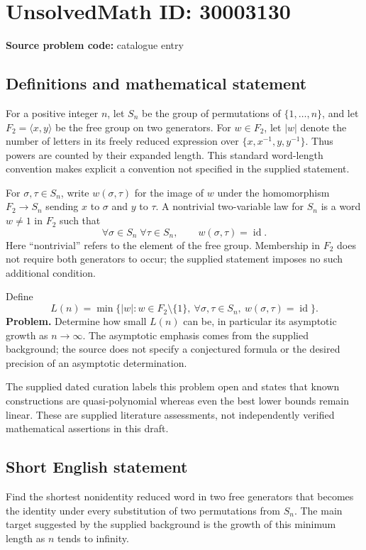 \documentclass[11pt]{article}
\begin{document}
\section*{UnsolvedMath ID: 30003130}
\textbf{Source problem code:} catalogue entry
\subsection{Definitions and mathematical statement}
For a positive integer \(n\), let \(S_n\) be the group of permutations of \(\{1,\ldots,n\}\), and let \(F_2=\langle x,y\rangle\) be the free group on two generators. For \(w\in F_2\), let \(|w|\) denote the number of letters in its freely reduced expression over \(\{x,x^{-1},y,y^{-1}\}\). Thus powers are counted by their expanded length. This standard word-length convention makes explicit a convention not specified in the supplied statement.

For \(\sigma,\tau\in S_n\), write \(w(\sigma,\tau)\) for the image of \(w\) under the homomorphism \(F_2\to S_n\) sending \(x\) to \(\sigma\) and \(y\) to \(\tau\). A nontrivial two-variable law for \(S_n\) is a word \(w\ne 1\) in \(F_2\) such that
\[
\forall\sigma\in S_n\;\forall\tau\in S_n,\qquad w(\sigma,\tau)=\operatorname{id}.
\]
Here ``nontrivial'' refers to the element of the free group. Membership in \(F_2\) does not require both generators to occur; the supplied statement imposes no such additional condition.

Define
\[
L(n)=\min\bigl\{|w|:w\in F_2\setminus\{1\},\ \forall\sigma,\tau\in S_n,\ w(\sigma,\tau)=\operatorname{id}\bigr\}.
\]
\textbf{Problem.} Determine how small \(L(n)\) can be, in particular its asymptotic growth as \(n\to\infty\). The asymptotic emphasis comes from the supplied background; the source does not specify a conjectured formula or the desired precision of an asymptotic determination.

The supplied dated curation labels this problem open and states that known constructions are quasi-polynomial whereas even the best lower bounds remain linear. These are supplied literature assessments, not independently verified mathematical assertions in this draft.
\subsection{Short English statement}
Find the shortest nonidentity reduced word in two free generators that becomes the identity under every substitution of two permutations from \(S_n\). The main target suggested by the supplied background is the growth of this minimum length as \(n\) tends to infinity.
\end{document}
